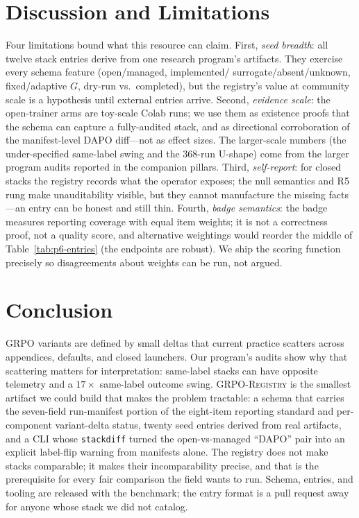 \documentclass{article}
\begin{document}
 \section{Discussion and Limitations}
\label{sec:p6-discussion}
Four limitations bound what this resource can claim. First, \emph{seed
breadth}: all twelve stack entries derive from one research program's
artifacts. They exercise every schema feature (open/managed, implemented/
surrogate/absent/unknown, fixed/adaptive $G$, dry-run vs.\ completed), but the
registry's value at community scale is a hypothesis until external entries
arrive. Second, \emph{evidence scale}: the open-trainer arms are toy-scale
Colab runs; we use them as existence proofs that the schema can capture a
fully-audited stack, and as directional corroboration of the manifest-level
DAPO diff---not as effect sizes. The larger-scale numbers (the under-specified
same-label swing and the 368-run U-shape) come from the larger program audits
reported in the companion pillars. Third, \emph{self-report}: for closed
stacks the registry records what the operator exposes; the null semantics and
R5 rung make unauditability visible, but they cannot manufacture the missing
facts---an entry can be honest and still thin. Fourth, \emph{badge
semantics}: the badge measures reporting coverage with equal item weights; it
is not a correctness proof, not a quality score, and alternative weightings
would reorder the middle of Table~\ref{tab:p6-entries} (the endpoints are
robust). We ship the scoring function precisely so disagreements about
weights can be run, not argued.

\section{Conclusion}
\label{sec:p6-conclusion}
GRPO variants are defined by small deltas that current practice scatters
across appendices, defaults, and closed launchers. Our program's audits show
why that scattering matters for interpretation: same-label stacks can have
opposite telemetry and a $17\times$ same-label outcome swing.
\textsc{GRPO-Registry} is the smallest artifact we could build that makes the
problem tractable: a schema that
carries the seven-field run-manifest portion of the eight-item reporting
standard and per-component
variant-delta status, twenty seed entries derived from real artifacts, and a
CLI whose \texttt{stackdiff} turned the open-vs-managed ``DAPO'' pair into an
explicit label-flip warning from manifests alone. The registry does not make
stacks comparable; it makes their incomparability precise, and that is the
prerequisite for every fair comparison the field wants to run. Schema,
entries, and tooling are released with the benchmark; the entry format is a
pull request away for anyone whose stack we did not catalog.
 \appendix
\end{document}
